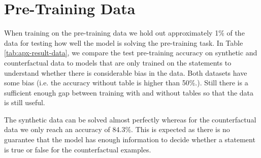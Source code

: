 \documentclass[11pt,a4paper]{article}
\theoremstyle{definition}
\begin{document}
\section{Pre-Training Data}
\label{sec:apx-table-pruning}

When training on the pre-training data we hold out approximately 1\% of the data for testing how well the model is solving the pre-training task.
In Table \ref{tab:apx-result-data}, we compare the test pre-training accuracy on synthetic and counterfactual data to models that are only trained on the statements to understand whether there is considerable bias in the data.
Both datasets have some bias (i.e. the accuracy without table is higher than 50\%.). Still there is a sufficient enough gap between training with and without tables so that the data is still useful. 

The synthetic data can be solved almost perfectly whereas for the counterfactual data we only reach an accuracy of 84.3\%.
This is expected as there is no guarantee that the model has enough information to decide whether a statement is true or false for the counterfactual examples.

\begin{table}[H]
\centering
{}
\caption{Accuracy on synthetic (Val) and counterfactual held-out sets (Val) of the pre-traininig data.}
\label{tab:apx-result-data}
\end{table}
\end{document}
